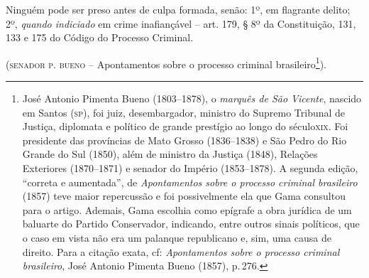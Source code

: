 Ninguém pode ser preso antes de culpa formada, senão: 1º, em flagrante
delito; 2º, \emph{quando indiciado} em crime inafiançável -- art. 179, §
8º da Constituição, 131, 133 e 175 do Código do
Processo Criminal.

(\textsc{senador p. bueno} -- Apontamentos sobre o processo criminal
brasileiro\footnote{ José Antonio Pimenta Bueno (1803--1878), o
  \emph{marquês de São Vicente}, nascido em Santos (\textsc{sp}), foi juiz,
  desembargador, ministro do Supremo Tribunal de Justiça, diplomata e
  político de grande prestígio ao longo do século\textsc{xix}. Foi presidente
  das províncias de Mato Grosso (1836--1838) e São Pedro do Rio Grande do
  Sul (1850), além de ministro da Justiça (1848), Relações Exteriores
  (1870--1871) e senador do Império (1853--1878). A segunda edição,
  ``correta e aumentada'', de \emph{Apontamentos sobre o processo criminal
  brasileiro} (1857) teve maior repercussão e foi possivelmente ela que
  Gama consultou para o artigo. Ademais, Gama escolhia como epígrafe a
  obra jurídica de um baluarte do Partido Conservador, indicando, entre
  outros sinais políticos, que o caso em vista não era um palanque
  republicano e, sim, uma causa de direito. Para a citação exata, cf:
  \emph{Apontamentos sobre o processo criminal brasileiro}, José Antonio
  Pimenta Bueno (1857), p.\,276.}).

